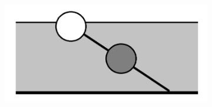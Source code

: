 \begin{problem}{5}
\begin{figure}[h!]
\begin{subfigure}{.4\textwidth}
			\caption{}
			\label{fig:vuo201883}
		\end{subfigure}
		\begin{subfigure}{.4\textwidth}
			\centering
			\includegraphics[width=0.5\linewidth]{class10/vuo_2013_85}
			\caption{}
			\label{fig:vuo201385}	
		\end{subfigure}
		\caption{}
	\end{figure}
	
\end{problem}
